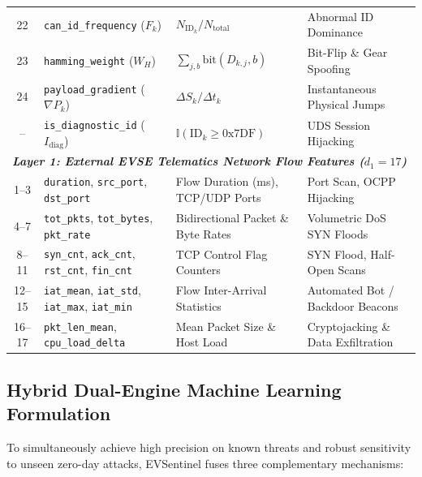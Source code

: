 \documentclass[conference]{IEEEtran}
\begin{document}
\begin{table}[!t]
{\begin{tabular}{c l l l}
22 & \texttt{can\_id\_frequency} ($F_k$) & $N_{\text{ID}_k} / N_{\text{total}}$ & Abnormal ID Dominance \\
23 & \texttt{hamming\_weight} ($W_H$) & $\sum_{j,b} \text{bit}(D_{k,j}, b)$ & Bit-Flip \& Gear Spoofing \\
24 & \texttt{payload\_gradient} ($\nabla P_k$) & $\Delta S_k / \Delta t_k$ & Instantaneous Physical Jumps \\
-- & \texttt{is\_diagnostic\_id} ($I_{\text{diag}}$) & $\mathbb{I}(\text{ID}_k \ge 0\text{x}7\text{DF})$ & UDS Session Hijacking \\
\midrule
\multicolumn{4}{l}{\textit{\textbf{Layer 1: External EVSE Telematics Network Flow Features ($d_1 = 17$)}}} \\
\midrule
1--3 & \texttt{duration}, \texttt{src\_port}, \texttt{dst\_port} & Flow Duration (ms), TCP/UDP Ports & Port Scan, OCPP Hijacking \\
4--7 & \texttt{tot\_pkts}, \texttt{tot\_bytes}, \texttt{pkt\_rate} & Bidirectional Packet \& Byte Rates & Volumetric DoS SYN Floods \\
8--11 & \texttt{syn\_cnt}, \texttt{ack\_cnt}, \texttt{rst\_cnt}, \texttt{fin\_cnt} & TCP Control Flag Counters & SYN Flood, Half-Open Scans \\
12--15 & \texttt{iat\_mean}, \texttt{iat\_std}, \texttt{iat\_max}, \texttt{iat\_min} & Flow Inter-Arrival Statistics & Automated Bot / Backdoor Beacons \\
16--17 & \texttt{pkt\_len\_mean}, \texttt{cpu\_load\_delta} & Mean Packet Size \& Host Load & Cryptojacking \& Data Exfiltration \\
\bottomrule
\end{tabular}%
}
\end{table}

\subsection{Hybrid Dual-Engine Machine Learning Formulation}
To simultaneously achieve high precision on known threats and robust sensitivity to unseen zero-day attacks, EVSentinel fuses three complementary mechanisms:
\end{document}
